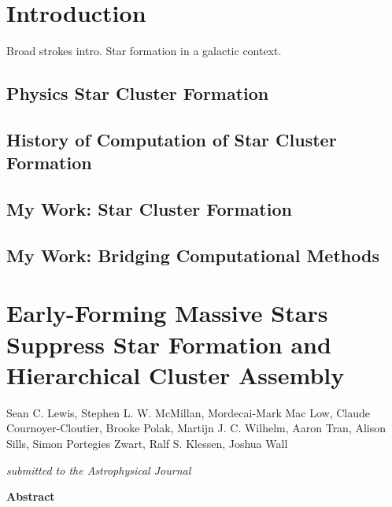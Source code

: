 \documentclass[twoside]{drexel-thesis}
\begin{document}
\begin{thesis}

\chapter{Introduction}
Broad strokes intro. Star formation in a galactic context.
\section{Physics Star Cluster Formation}

\section{History of Computation of Star Cluster Formation}

\section{My Work: Star Cluster Formation}

\section{My Work: Bridging Computational Methods}

\chapter[Early-Forming Massive Stars]{Early-Forming Massive Stars Suppress Star Formation and Hierarchical Cluster Assembly}
Sean C. Lewis, Stephen L. W. McMillan, Mordecai-Mark Mac Low, Claude Cournoyer-Cloutier, Brooke Polak, Martijn J. C. Wilhelm, Aaron Tran, Alison Sills, Simon Portegies Zwart, Ralf S. Klessen, Joshua Wall

\emph{submitted to the Astrophysical Journal}

\centerline{\textbf{Abstract}}


\end{thesis}
\end{document}
